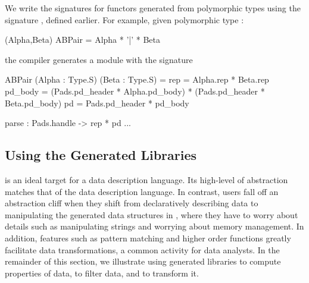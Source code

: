 We write the signatures for functors generated from polymorphic types
using the signature , defined earlier.  For example, given polymorphic 
type :  
\begin{code}\scriptsize
{} (Alpha,Beta) ABPair = Alpha * '|' * Beta\end{code}%
the compiler generates a module with the signature
\begin{code}\scriptsize
{}  ABPair (Alpha : Type.S) (Beta : Type.S) = 
   rep = Alpha.rep * Beta.rep
   pd\_body = (Pads.pd_header * Alpha.pd\_body) * 
                 (Pads.pd_header * Beta.pd\_body)
   pd = Pads.pd_header * pd\_body

   parse : Pads.handle -> rep * pd
  ...
\end{code}%

\subsection{Using the Generated Libraries}
\ocaml{} is an ideal target for a data description language.
Its high-level of abstraction matches that of the
data description language.  In contrast, \padsc{} users fall off an
abstraction cliff when they shift from declaratively describing data
to manipulating the generated data structures in \C{}, where they have
to worry about details such as manipulating \C{} strings and worrying
about memory management.  In addition, features such as pattern matching
and higher order functions greatly facilitate data transformations, a
common activity for data analysts.
In the remainder of this section, we illustrate using
generated \padsml{} libraries to compute properties of data, to filter
data, and to transform it.

